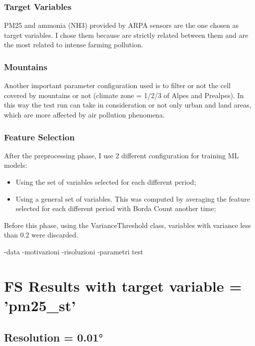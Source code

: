 \subsubsection{Target Variables}
PM25 and ammonia (NH3) provided by ARPA sensors are the one chosen as target variables. I chose them because are strictly related between them and are the most related to intense farming pollution.

\subsubsection{Mountains}
Another important parameter configuration used is to filter or not the cell covered by mountains or not (climate zone = 1/2/3 of Alpes and Prealpes). In this way the test run can take in consideration or not only urban and land areas, which are more affected by air pollution phenomena.


\subsubsection{Feature Selection}
After the preprocessing phase, I use 2 different configuration for training ML models:
\begin{itemize}
    \item Using the set of variables selected for each different period;
    \item Using a general set of variables. This was computed by averaging the feature selected for each different period with Borda Count another time;
\end{itemize}
Before this phase, using the VarianceThreshold class, variables with variance less than 0.2 were discarded. 

-data
-motivazioni
-risoluzioni
-parametri test
\section{FS Results with target variable = 'pm25\_st'}
\label{sec:pm25}
\subsection{Resolution = 0.01°}
